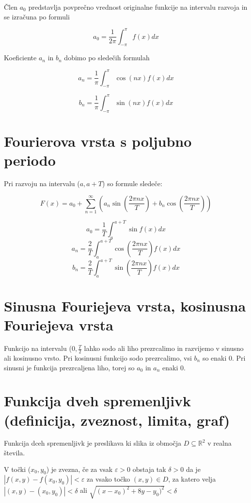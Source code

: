 \documentclass[12pt]{report}
\begin{document}
Člen $a_0$ predstavlja povprečno vrednost originalne funkcije na intervalu razvoja in se izračuna po formuli

\[a_0=\frac{1}{2\pi} \int_{-\pi}^{\pi} f(x)dx \]

Koeficiente $a_n$ in $b_n$ dobimo po sledečih formulah

\[a_n=\frac{1}{\pi} \int_{-\pi}^{\pi} \cos(nx) f(x)dx \]

\[b_n=\frac{1}{\pi} \int_{-\pi}^{\pi} \sin(nx) f(x)dx \]





\section*{Fourierova vrsta s poljubno periodo}

Pri razvoju na intervalu ($a, a+T$) so formule sledeče:


\[F(x)=a_0 + \sum_{n=1}^\infty\left ( a_n\sin\left ( \frac{2\pi n x}{T} \right )+b_n\cos\left ( \frac{2\pi n x}{T} \right ) \right )\]

\[a_0=\frac{1}{T}\int_a^{a+T}\sin f(x)dx\]
\[a_n=\frac{2}{T}\int_a^{a+T}\cos(\frac{2\pi n x}{T}) f(x)dx\]
\[b_n=\frac{2}{T}\int_a^{a+T}\sin(\frac{2\pi n x}{T}) f(x)dx\]

\section*{Sinusna Fouriejeva vrsta, kosinusna Fouriejeva vrsta}
Funkcijo na intervalu ($0, \frac{T}{2}$ lahko sodo ali liho prezrcalimo in razvijemo v sinusno ali kosinusno vrsto. Pri kosinusni funkcijo sodo prezrcalimo, vsi $b_n$ so enaki 0. Pri sinusni je funkcija prezrcaljena liho, torej so $a_0$ in $a_n$ enaki 0.


\section*{Funkcija dveh spremenljivk (definicija, zveznost, limita, graf)}

Funkcija dceh spremenljivk je preslikava ki slika iz območja $D \subseteq \mathbb{R}^2$ v realna števila.

V točki ($x_0, y_0$) je zvezna, če za vsak $\varepsilon>0$ obstaja tak $\delta >0$ da je 
\\ $|f(x,y)-f(x_0,y_0)| < \varepsilon$ za vsako točko $(x,y) \in D$, za katero velja \\ $|(x,y)-(x_0,y_0)| < \delta$ ali $\sqrt{(x-x_0)^2+8y-y_0)^2} < \delta$
\end{document}
